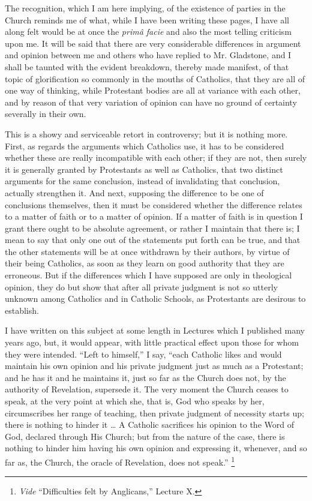 The recognition, which I am here implying, of the existence of
parties in the Church reminds me of what, while I have been writing
these pages, I have all along felt would be at once the \emph{primâ facie}
and also the most telling criticism upon me. It will be said that there
are very considerable differences in argument and opinion between me and
others who have replied to Mr. Gladstone, and I shall be taunted with
the evident breakdown, thereby made manifest, of that topic of
glorification so commonly in the mouths of Catholics, that they are all
of one way of thinking, while Protestant bodies are all at variance with
each other, and by reason of that very variation of opinion can have no
ground of certainty severally in their own.

This is a showy and serviceable retort in controversy; but it is
nothing more. First, as regards the arguments which Catholics use, it
has to be considered whether these are really incompatible with each
other; if they are not, then surely it is generally granted by
Protestants as well as Catholics, that two distinct arguments for the
same conclusion, instead of invalidating that conclusion, actually
strengthen it. And next, supposing the difference to be one of
conclusions themselves, then it must be considered whether the
difference relates to a matter of faith or to a matter of opinion. If a
matter of faith is in question I grant there ought to be absolute
agreement, or rather I maintain that there is; I mean to say that only
one out of the statements put forth can be true, and that the other
statements will be at once withdrawn by their authors, by virtue
of their being Catholics, as soon as they learn on good authority that
they are erroneous. But if the differences which I have supposed are
only in theological opinion, they do but show that after all private
judgment is not so utterly unknown among Catholics and in Catholic
Schools, as Protestants are desirous to establish.

I have written on this subject at some length in Lectures which I
published many years ago, but, it would appear, with little practical
effect upon those for whom they were intended. ``Left to
himself,'' I say, ``each Catholic likes and would maintain his
own opinion and his private judgment just as much as a Protestant; and
he has it and he maintains it, just so far as the Church does not, by
the authority of Revelation, supersede it. The very moment the Church
ceases to speak, at the very point at which she, that is, God who speaks
by her, circumscribes her range of teaching, then private judgment of
necessity starts up; there is nothing to hinder it … A Catholic
sacrifices his opinion to the Word of God, declared through His Church;
but from the nature of the case, there is nothing to hinder him having
his own opinion and expressing it, whenever, and so far as, the Church,
the oracle of Revelation, does not speak.'' \footnote{\emph{Vide} ``Difficulties felt by
Anglicans,'' Lecture X.}


